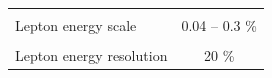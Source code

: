 \begin{table}[!htb]
\begin{center}
\begin{tabular}{|lc|}
			\hline %
			\vspace{-0.4cm} & \\
			Lepton energy scale & 0.04 -- 0.3 \% \\ 
			\vspace{-0.4cm} & \\
			Lepton energy resolution & 20 \% \\ 
			\hline %
			\hline %
		\end{tabular}
		\normalsize
	\end{center}
\end{table}



